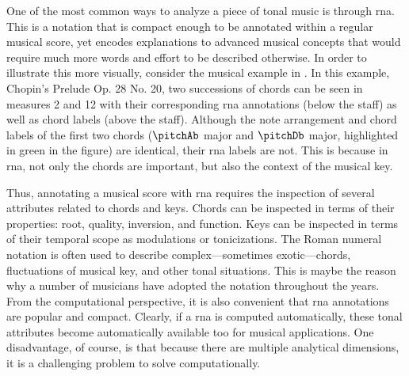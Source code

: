 
One of the most common ways to analyze a piece of tonal
music is through \gls{rna}. This is a notation that is
compact enough to be annotated within a regular musical
score, yet encodes explanations to advanced musical concepts
that would require much more words and effort to be
described otherwise. In order to illustrate this more
visually, consider the musical example in
. In this example, Chopin's
Prelude Op. 28 No. 20, two successions of chords can be seen
in measures 2 and 12 with their corresponding \gls{rna}
annotations (below the staff) as well as chord labels (above
the staff). Although the note arrangement and chord labels
of the first two chords ($\pitchAb$ major and $\pitchDb$
major, highlighted in green in the figure) are identical,
their \gls{rna} labels are not. This is because in
\gls{rna}, not only the chords are important, but also the
context of the musical key.


Thus, annotating a musical score with \gls{rna} requires the
inspection of several attributes related to chords and keys.
Chords can be inspected in terms of their properties: root,
quality, inversion, and function. Keys can be inspected in
terms of their temporal scope as modulations or
tonicizations. The Roman numeral notation is often used to
describe complex---sometimes exotic---chords, fluctuations
of musical key, and other tonal situations. This is maybe
the reason why a number of musicians have adopted the
notation throughout the years. From the computational
perspective, it is also convenient that \gls{rna}
annotations are popular and compact. Clearly, if a \gls{rna}
is computed automatically, these tonal attributes become
automatically available too for musical applications. One
disadvantage, of course, is that because there are multiple
analytical dimensions, it is a challenging problem to solve
computationally.



